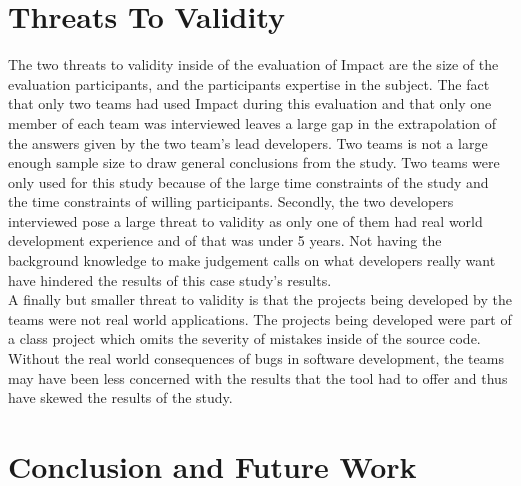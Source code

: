\documentclass[conference]{IEEEtran}
\begin{document}
\section{Threats To Validity}
The two threats to validity inside of the evaluation of Impact are the size of the evaluation
participants, and the participants expertise in the subject. The fact that only two teams had
used Impact during this evaluation and that only one member of each team was interviewed
leaves a large gap in the extrapolation of the answers given by the two team's lead 
developers. Two teams is not a large enough sample size to draw general conclusions
from the study. Two teams were only used for this study because of the large time constraints
of the study and the time constraints of willing participants. Secondly, the two developers
interviewed pose a large threat to validity as only one of them had real world development
experience and of that was under 5 years. Not having the background knowledge to make
judgement calls on what developers really want have hindered the results of this case study's 
results. \\

A finally but smaller threat to validity is that the projects being developed by the teams were
not real world applications. The projects being developed were part of a class project which
omits the severity of mistakes inside of the source code. Without the real world consequences
of bugs in software development, the teams may have been less concerned with the results
that the tool had to offer and thus have skewed the results of the study.\\

\section{Conclusion and Future Work}






\end{document}
